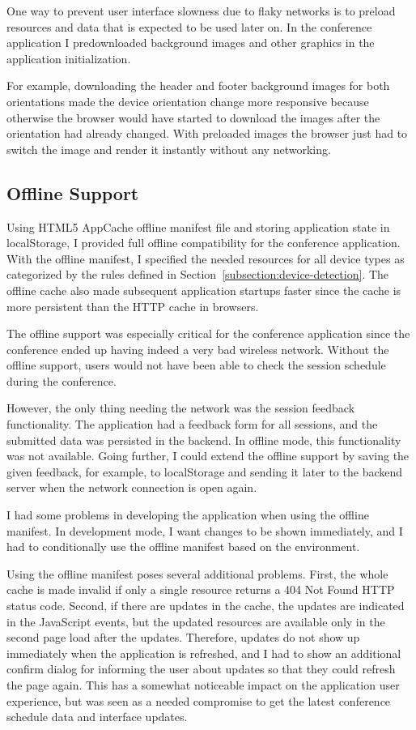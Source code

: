 One way to prevent user interface slowness due to flaky networks is to
preload resources and data that is expected to be used later on. In
the conference application I predownloaded background images and other
graphics in the application initialization.

For example, downloading the header and footer background images for
both orientations made the device orientation change more responsive
because otherwise the browser would have started to download the
images after the orientation had already changed. With preloaded
images the browser just had to switch the image and render it
instantly without any networking.

\subsection{Offline Support}

Using HTML5 AppCache offline manifest file and storing application
state in localStorage, I provided full offline compatibility for the
conference application. With the offline manifest, I specified the
needed resources for all device types as categorized by the rules
defined in Section~\ref{subsection:device-detection}. The offline
cache also made subsequent application startups faster since the cache
is more persistent than the HTTP cache in browsers.

The offline support was especially critical for the conference
application since the conference ended up having indeed a very bad
wireless network.  Without the offline support, users would not have
been able to check the session schedule during the conference.

However, the only thing needing the network was the session feedback
functionality. The application had a feedback form for all sessions,
and the submitted data was persisted in the backend. In offline mode,
this functionality was not available. Going further, I could extend
the offline support by saving the given feedback, for example, to
localStorage and sending it later to the backend server when the
network connection is open again.

I had some problems in developing the application when using the
offline manifest. In development mode, I want changes to be shown
immediately, and I had to conditionally use the offline manifest based
on the environment.

Using the offline manifest poses several additional problems. First,
the whole cache is made invalid if only a single resource returns a
404 Not Found HTTP status code. Second, if there are updates in the
cache, the updates are indicated in the JavaScript events, but the
updated resources are available only in the second page load after the
updates. Therefore, updates do not show up immediately when the
application is refreshed, and I had to show an additional confirm
dialog for informing the user about updates so that they could refresh
the page again. This has a somewhat noticeable impact on the
application user experience, but was seen as a needed compromise to
get the latest conference schedule data and interface updates.

